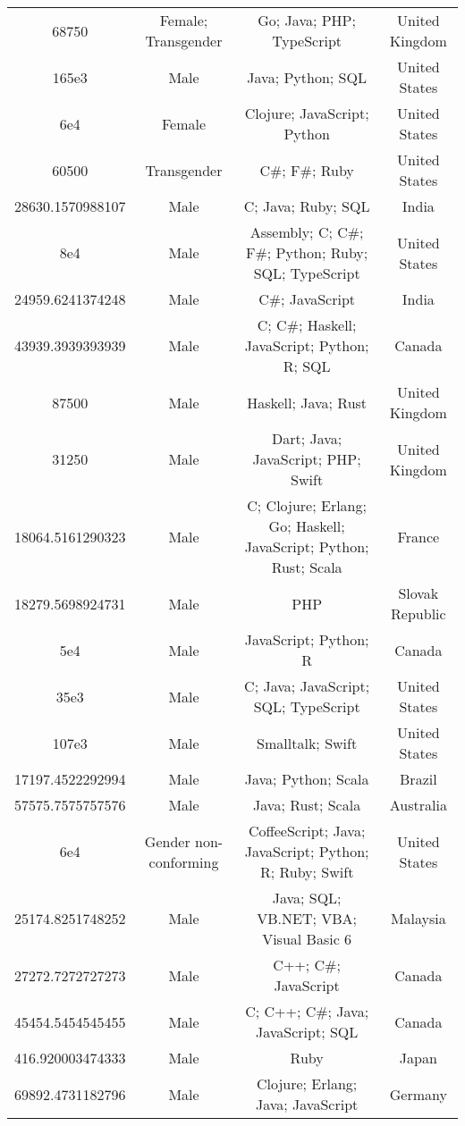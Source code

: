 \begin{center}
\begin{tabular}{ |c|c|c|c| }
68750  &  Female; Transgender  &  Go; Java; PHP; TypeScript  &  United Kingdom  \\ 
165e3  &  Male  &  Java; Python; SQL  &  United States  \\ 
6e4  &  Female  &  Clojure; JavaScript; Python  &  United States  \\ 
60500  &  Transgender  &  C\#; F\#; Ruby  &  United States  \\ 
28630.1570988107  &  Male  &  C; Java; Ruby; SQL  &  India  \\ 
8e4  &  Male  &  Assembly; C; C\#; F\#; Python; Ruby; SQL; TypeScript  &  United States  \\ 
24959.6241374248  &  Male  &  C\#; JavaScript  &  India  \\ 
43939.3939393939  &  Male  &  C; C\#; Haskell; JavaScript; Python; R; SQL  &  Canada  \\ 
87500  &  Male  &  Haskell; Java; Rust  &  United Kingdom  \\ 
31250  &  Male  &  Dart; Java; JavaScript; PHP; Swift  &  United Kingdom  \\ 
18064.5161290323  &  Male  &  C; Clojure; Erlang; Go; Haskell; JavaScript; Python; Rust; Scala  &  France  \\ 
18279.5698924731  &  Male  &  PHP  &  Slovak Republic  \\ 
5e4  &  Male  &  JavaScript; Python; R  &  Canada  \\ 
35e3  &  Male  &  C; Java; JavaScript; SQL; TypeScript  &  United States  \\ 
107e3  &  Male  &  Smalltalk; Swift  &  United States  \\ 
17197.4522292994  &  Male  &  Java; Python; Scala  &  Brazil  \\ 
57575.7575757576  &  Male  &  Java; Rust; Scala  &  Australia  \\ 
6e4  &  Gender non-conforming  &  CoffeeScript; Java; JavaScript; Python; R; Ruby; Swift  &  United States  \\ 
25174.8251748252  &  Male  &  Java; SQL; VB.NET; VBA; Visual Basic 6  &  Malaysia  \\ 
27272.7272727273  &  Male  &  C++; C\#; JavaScript  &  Canada  \\ 
45454.5454545455  &  Male  &  C; C++; C\#; Java; JavaScript; SQL  &  Canada  \\ 
416.920003474333  &  Male  &  Ruby  &  Japan  \\ 
69892.4731182796  &  Male  &  Clojure; Erlang; Java; JavaScript  &  Germany  \\ 

\end{tabular}
\end{center}
